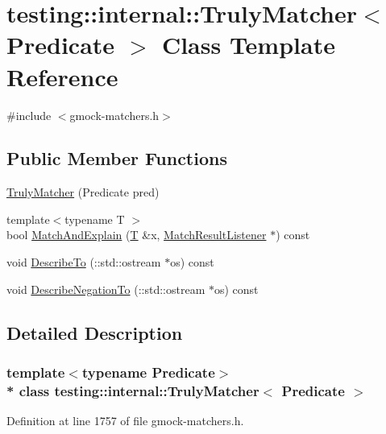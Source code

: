 \hypertarget{classtesting_1_1internal_1_1_truly_matcher}{}\section{testing\+:\+:internal\+:\+:Truly\+Matcher$<$ Predicate $>$ Class Template Reference}
\label{classtesting_1_1internal_1_1_truly_matcher}


{\ttfamily \#include $<$gmock-\/matchers.\+h$>$}

\subsection*{Public Member Functions}
\begin{DoxyCompactItemize}
\item 
\hyperlink{classtesting_1_1internal_1_1_truly_matcher_a9fdc4ddba121e0dad4773b5685e0f28d}{Truly\+Matcher} (Predicate pred)
\item 
{\footnotesize template$<$typename T $>$ }\\bool \hyperlink{classtesting_1_1internal_1_1_truly_matcher_a676cf30c5b8f027c50b0899bf814ccc8}{Match\+And\+Explain} (\hyperlink{functions__7_8js_adf1f3edb9115acb0a1e04209b7a9937b}{T} \&x, \hyperlink{classtesting_1_1_match_result_listener}{Match\+Result\+Listener} $\ast$) const 
\item 
void \hyperlink{classtesting_1_1internal_1_1_truly_matcher_a21bcbffbcb6729d0de3efbb4e312bb40}{Describe\+To} (\+::std\+::ostream $\ast$os) const 
\item 
void \hyperlink{classtesting_1_1internal_1_1_truly_matcher_a32261400e7c75cb4378c2fdf1d37aa35}{Describe\+Negation\+To} (\+::std\+::ostream $\ast$os) const 
\end{DoxyCompactItemize}


\subsection{Detailed Description}
\subsubsection*{template$<$typename Predicate$>$\\*
class testing\+::internal\+::\+Truly\+Matcher$<$ Predicate $>$}



Definition at line 1757 of file gmock-\/matchers.\+h.



